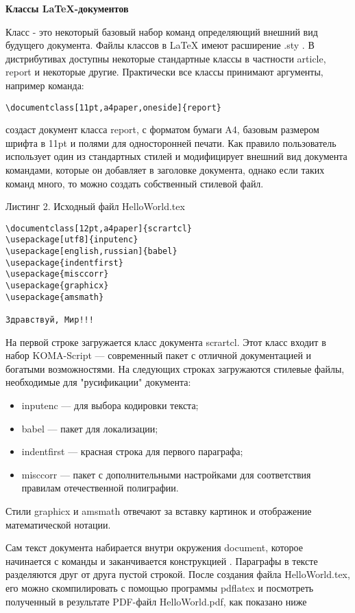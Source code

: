 \textbf{Классы LaTeX-документов}

Класс -  это некоторый базовый набор команд определяющий внешний вид будущего документа. Файлы классов в LaTeX имеют расширение .sty . В дистрибутивах доступны некоторые стандартные классы в частности article, report и некоторые другие. Практически все классы принимают аргументы, например команда:

\begin{verbatim}
\documentclass[11pt,a4paper,oneside]{report}
\end{verbatim}


создаст документ класса report, с форматом бумаги A4, базовым размером шрифта в 11pt и полями для односторонней печати.
Как правило пользователь использует один из стандартных стилей и модифицирует внешний вид документа командами, которые он добавляет в заголовке документа, однако если таких команд много, то можно создать собственный стилевой файл.\cite{lvovsky_2003}
 
Листинг 2. Исходный файл HelloWorld.tex
\begin{verbatim}
\documentclass[12pt,a4paper]{scrartcl}
\usepackage[utf8]{inputenc}
\usepackage[english,russian]{babel}
\usepackage{indentfirst}
\usepackage{misccorr}
\usepackage{graphicx}
\usepackage{amsmath}

Здравствуй, Мир!!!

\end{verbatim}

На первой строке загружается класс документа scrartcl. Этот класс входит в набор KOMA-Script — современный пакет с отличной документацией и богатыми возможностями. На следующих строках загружаются стилевые файлы, необходимые для "русификации" документа:
	
\begin{itemize}
\item inputenc — для выбора кодировки текста;
\item babel — пакет для локализации;
\item indentfirst — красная строка для первого параграфа;
\item misccorr — пакет с дополнительными настройками для соответствия правилам отечественной полиграфии.
\end{itemize}

Стили graphicx и amsmath отвечают за вставку картинок и отображение математической нотации.

Сам текст документа набирается внутри окружения document, которое начинается с команды \verb|| и заканчивается конструкцией \verb||. Параграфы в тексте разделяются друг от друга пустой строкой. После создания файла HelloWorld.tex, его можно скомпилировать с помощью программы pdflatex и посмотреть полученный в результате PDF-файл HelloWorld.pdf, как показано ниже

